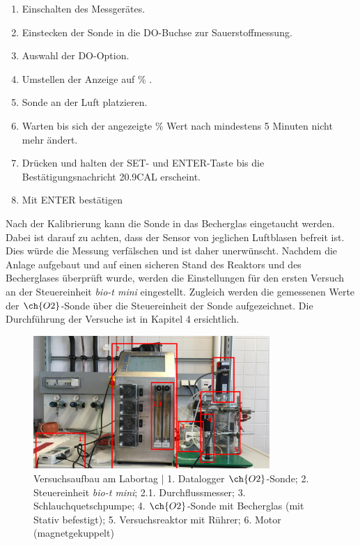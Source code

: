 \documentclass[12pt,liststotoc]{report}
\begin{document}
\begin{enumerate}
    \item Einschalten des Messgerätes.
    \item Einstecken der Sonde in die DO-Buchse zur Sauerstoffmessung.
    \item Auswahl der DO-Option.
    \item Umstellen der Anzeige auf \% .  
    \item Sonde an der Luft platzieren.
    \item Warten bis sich der angezeigte \% Wert nach mindestens 5 Minuten nicht mehr ändert.
    \item Drücken und halten der SET- und ENTER-Taste bis die Bestätigungsnachricht 20.9CAL erscheint. 
    \item Mit ENTER bestätigen
\end{enumerate}

Nach der Kalibrierung kann die Sonde in das Becherglas eingetaucht werden. Dabei ist darauf zu achten, dass der Sensor von jeglichen Luftblasen befreit ist. Dies würde die Messung verfälschen und ist daher unerwünscht. Nachdem die Anlage aufgebaut und auf einen sicheren Stand des Reaktors und des Becherglases überprüft wurde, werden die Einstellungen für den ersten Versuch an der Steuereinheit \textit{bio-t mini} eingestellt. Zugleich werden die gemessenen Werte der $\ch{O2}$-Sonde über die Steuereinheit der Sonde aufgezeichnet. Die Durchführung der Versuche ist in Kapitel 4 ersichtlich. 


\begin{figure}[H]
\centering
\includegraphics[width=0.8\textwidth]{Graphics/Versuchsaufbau_nummeriert.pdf} 
\caption[Versuchsaufbau am Labortag ]{Versuchsaufbau am Labortag | 1. Datalogger $\ch{O2}$-Sonde; 2. Steuereinheit \textit{bio-t mini}; 2.1. Durchflussmesser; 3. Schlauchquetschpumpe; 4. $\ch{O2}$-Sonde mit Becherglas (mit Stativ befestigt); 5. Versuchsreaktor mit Rührer; 6. Motor (magnetgekuppelt) }
\label{Versuchsaufbau}
\end{figure}
\noindent
\end{document}
